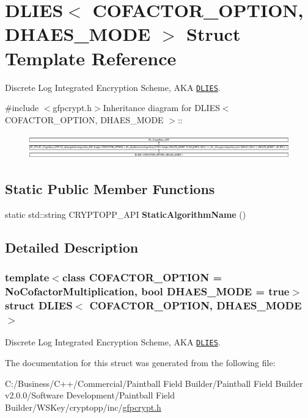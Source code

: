 \hypertarget{struct_d_l_i_e_s}{
\section{DLIES$<$ COFACTOR\_\-OPTION, DHAES\_\-MODE $>$ Struct Template Reference}
\label{struct_d_l_i_e_s}
}


Discrete Log Integrated Encryption Scheme, AKA \href{http://www.weidai.com/scan-mirror/ca.html#DLIES}{\tt DLIES}.  


{\ttfamily \#include $<$gfpcrypt.h$>$}Inheritance diagram for DLIES$<$ COFACTOR\_\-OPTION, DHAES\_\-MODE $>$::\begin{figure}[H]
\begin{center}
\leavevmode
\includegraphics[height=1.08387cm]{struct_d_l_i_e_s}
\end{center}
\end{figure}
\subsection*{Static Public Member Functions}
\begin{DoxyCompactItemize}
\item 
\hypertarget{struct_d_l_i_e_s_a333eb3491d6f321528a334710b08f9d5}{
static std::string CRYPTOPP\_\-API {\bfseries StaticAlgorithmName} ()}
\label{struct_d_l_i_e_s_a333eb3491d6f321528a334710b08f9d5}

\end{DoxyCompactItemize}


\subsection{Detailed Description}
\subsubsection*{template$<$class COFACTOR\_\-OPTION = NoCofactorMultiplication, bool DHAES\_\-MODE = true$>$ struct DLIES$<$ COFACTOR\_\-OPTION, DHAES\_\-MODE $>$}

Discrete Log Integrated Encryption Scheme, AKA \href{http://www.weidai.com/scan-mirror/ca.html#DLIES}{\tt DLIES}. 

The documentation for this struct was generated from the following file:\begin{DoxyCompactItemize}
\item 
C:/Business/C++/Commercial/Paintball Field Builder/Paintball Field Builder v2.0.0/Software Development/Paintball Field Builder/WSKey/cryptopp/inc/\hyperlink{gfpcrypt_8h}{gfpcrypt.h}\end{DoxyCompactItemize}

